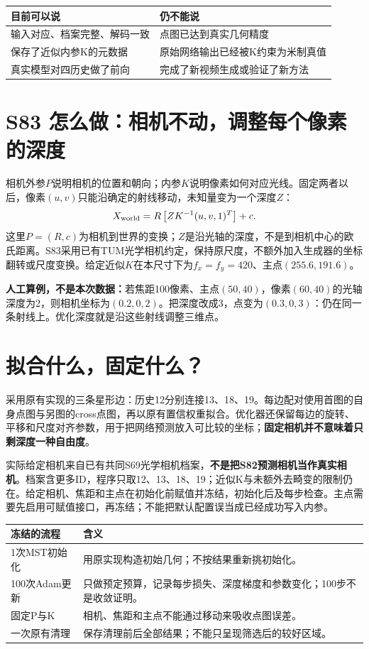 \documentclass[UTF8,11pt,a4paper]{ctexart}
\begin{document}
\begin{center}
\begin{tabular}{p{7.2cm}p{7.7cm}}\toprule
目前可以说&仍不能说\\\midrule
输入对应、档案完整、解码一致&点图已达到真实几何精度\\
保存了近似内参K的元数据&原始网络输出已经被K约束为米制真值\\
真实模型对四历史做了前向&完成了新视频生成或验证了新方法\\\bottomrule
\end{tabular}\end{center}
\clearpage

\section{ S83 怎么做：相机不动，调整每个像素的深度}
相机外参$P$说明相机的位置和朝向；内参$K$说明像素如何对应光线。固定两者以后，像素$(u,v)$只能沿确定的射线移动，未知量变为一个深度$Z$：
\[
X_{\rm world}=R\left[ZK^{-1}(u,v,1)^T\right]+c.
\]
这里$P=(R,c)$为相机到世界的变换；$Z$是沿光轴的深度，不是到相机中心的欧氏距离。S83采用已有TUM光学相机约定，保持原尺度，不额外加入生成器的坐标翻转或尺度变换。给定近似$K$在本尺寸下为$f_x=f_y=420$、主点$(255.6,191.6)$。

\noindent\textbf{人工算例，不是本次数据：}若焦距100像素、主点$(50,40)$，像素$(60,40)$的光轴深度为2，则相机坐标为$(0.2,0,2)$。把深度改成3，点变为$(0.3,0,3)$：仍在同一条射线上。优化深度就是沿这些射线调整三维点。

\section{ 拟合什么，固定什么？}
采用原有实现的三条星形边：历史12分别连接13、18、19。每边配对使用首图的自身点图与另图的cross点图，再以原有置信权重拟合。优化器还保留每边的旋转、平移和尺度对齐参数，用于把网络预测放入可比较的坐标；\textbf{固定相机并不意味着只剩深度一种自由度}。

实际给定相机来自已有共同S69光学相机档案，\textbf{不是把S82预测相机当作真实相机}。档案含更多ID，程序只取12、13、18、19；近似K与未额外去畸变的限制仍在。给定相机、焦距和主点在初始化前赋值并冻结，初始化后及每步检查。主点需要先启用可赋值接口，再冻结；不能把默认配置误当成已经成功写入内参。

\begin{center}\small
\begin{tabular}{p{3.0cm}p{11.9cm}}\toprule
冻结的流程&含义\\\midrule
1次MST初始化&用原实现构造初始几何；不按结果重新挑初始化。\\
100次Adam更新&只做预定预算，记录每步损失、深度梯度和参数变化；100步不是收敛证明。\\
固定P与K&相机、焦距和主点不能通过移动来吸收点图误差。\\
一次原有清理&保存清理前后全部结果；不能只呈现筛选后的较好区域。\\\bottomrule
\end{tabular}\end{center}
\end{document}
